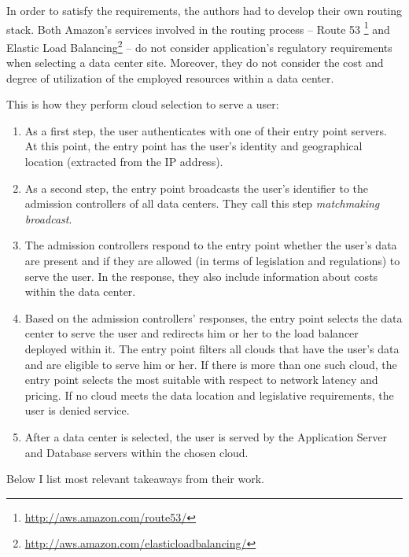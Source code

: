 \documentclass{uvamscse}
\begin{document}
In order to satisfy the requirements, the authors had to develop their own routing stack. Both Amazon's services involved in the routing process -- Route 53 \footnote{\url{http://aws.amazon.com/route53/}} and Elastic Load Balancing\footnote{\url{http://aws.amazon.com/elasticloadbalancing/}} -- do not consider application's regulatory requirements when selecting a data center site. Moreover, they do not consider the cost and degree of utilization of the employed resources within a data center.

This is how they perform cloud selection to serve a user:
\begin{enumerate}
  \item As a first step, the user authenticates with one of their entry point servers. At this point, the entry point has the user’s identity and geographical location (extracted from the IP address).
  \item As a second step, the entry point broadcasts the user’s identifier to the admission controllers of all data centers. They call this step \textit{matchmaking broadcast}.
  \item The admission controllers respond to the entry point whether the user’s data are present and if they are allowed (in terms of legislation and regulations) to serve the user. In the response, they also include information about costs within the data center.
  \item Based on the admission controllers’ responses, the entry point selects the data center to serve the user and redirects him or her to the load balancer deployed within it. The entry point filters all clouds that have the user’s data and are eligible to serve him or her. If there is more than one such cloud, the entry point selects the most suitable with respect to network latency and pricing. If no cloud meets the data location and legislative requirements, the user is denied service.
  \item After a data center is selected, the user is served by the Application Server and Database servers within the chosen cloud.
\end{enumerate}

Below I list most relevant takeaways from their work.
\end{document}
